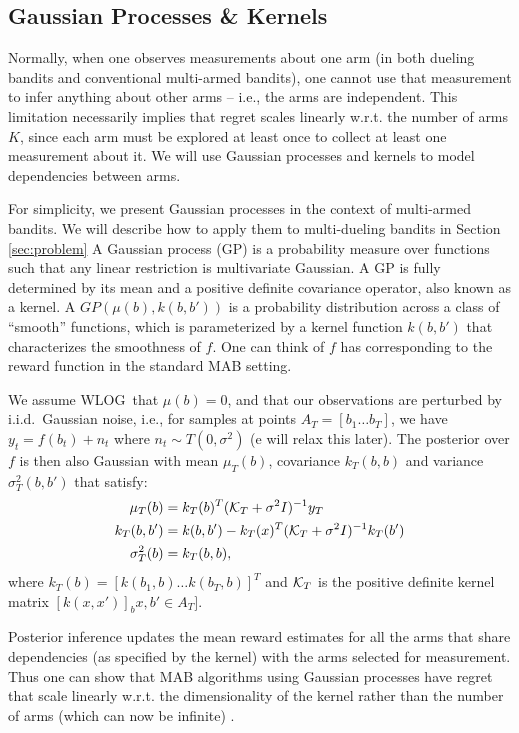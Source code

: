 \subsection{Gaussian Processes \& Kernels}
\label{sec:gp}

 Normally, when one observes measurements about one arm (in both dueling bandits and conventional multi-armed bandits), one cannot use that measurement to infer anything about other arms -- i.e., the arms are independent.  This limitation necessarily implies that regret scales linearly w.r.t. the number of arms $K$, since each arm must be explored at least once to collect at least one measurement about it.  We will use Gaussian processes and kernels to model dependencies between arms.

For simplicity, we present Gaussian processes in the context of multi-armed bandits.  We will describe how to apply them to multi-dueling bandits in Section \ref{sec:problem}
A Gaussian process (GP) is a probability measure over functions such that any linear restriction is multivariate Gaussian. A GP is fully determined by its mean and a positive definite covariance operator, also known as a kernel. 
A $GP(\mu(b),k(b, b'))$ is a probability distribution across a class of ``smooth'' functions, which is parameterized by a kernel function $k(b, b')$ that characterizes the smoothness of $f$.  One can think of $f$ has corresponding to the reward function in the standard MAB setting. 

We assume WLOG~that $\mu(b)=0$, and that our observations are perturbed by i.i.d.~Gaussian noise, i.e., for samples at points $A_T=[b_1 \dots b_T]$, we have $y_t = f(b_t) + n_t$ where $n_t \sim T(0, \sigma^2)$ (e will relax this later). The posterior over $f$ is then also Gaussian with mean $\mu_T( b)$, covariance $k_T(b, b)$ and variance $\sigma_T^2(b, b')$ that satisfy:
\begin{align*}
\mu_T(b) &= k_T(b)^T(\mathcal{K}_T + \sigma^2I)^{-1}y_T\\
k_T(b, b') &= k(b, b') - k_T(x)^T(\mathcal{K}_T + \sigma^2I)^{-1}k_T(b')\\
\sigma_T^2(b) &= k_T(b, b),
\end{align*}
where $k_T(b) = [k(b_1, b) \dots k(b_T, b)]^T$ and $\mathcal{K}_T$ is the positive definite kernel matrix $[k(x, x')]_bx, b' \in A_T]$.

Posterior inference updates the mean reward estimates for all the arms that share dependencies (as specified by the kernel) with the arms selected for measurement.  Thus one can show that MAB algorithms using Gaussian processes have regret that scale linearly w.r.t. the dimensionality of the kernel rather than the number of arms (which can now be infinite) \citep{srinivas10}.



